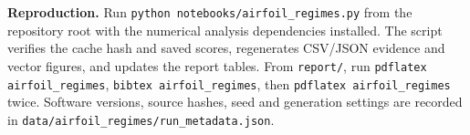 \documentclass[10pt,a4paper]{article}
\begin{document}
\textbf{Reproduction.} Run \texttt{python notebooks/airfoil\_regimes.py} from
the repository root with the numerical analysis dependencies installed.
The script verifies the cache hash and saved scores, regenerates CSV/JSON
evidence and vector figures, and updates the report tables. From
\texttt{report/}, run \texttt{pdflatex airfoil\_regimes},
\texttt{bibtex airfoil\_regimes}, then \texttt{pdflatex airfoil\_regimes} twice.
Software versions, source hashes, seed and generation settings are recorded
in \texttt{data/airfoil\_regimes/run\_metadata.json}.

\small


\end{document}
